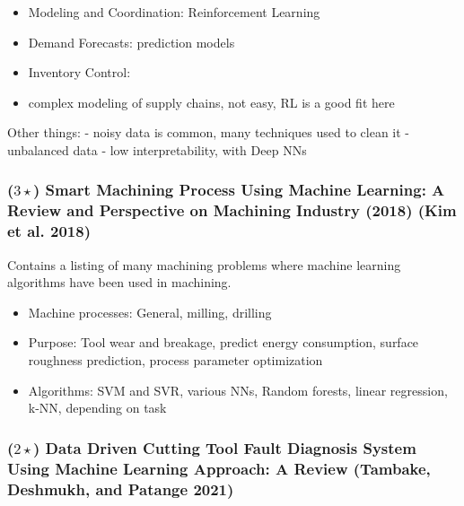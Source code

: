 \documentclass[
  letterpaper,
  DIV=11,
  numbers=noendperiod]{scrartcl}
\providecommand{\tightlist}{%
  \setlength{\itemsep}{0pt}\setlength{\parskip}{0pt}}\usepackage{longtable,booktabs,array}
\begin{document}
\begin{enumerate}
  \begin{itemize}
  \tightlist
  \item
    Modeling and Coordination: Reinforcement Learning
  \item
    Demand Forecasts: prediction models
  \item
    Inventory Control:\\
  \item
    complex modeling of supply chains, not easy, RL is a good fit here
  \end{itemize}
\end{enumerate}

Other things: - noisy data is common, many techniques used to clean it -
unbalanced data - low interpretability, with Deep NNs

\hypertarget{star-smart-machining-process-using-machine-learning-a-review-and-perspective-on-machining-industry-2018-kim2018_smartmachinereview}{%
\subsubsection{\texorpdfstring{(\(3\star\)) Smart Machining Process
Using Machine Learning: A Review and Perspective on Machining Industry
(2018) (Kim et al.
2018)}{(3\textbackslash star) Smart Machining Process Using Machine Learning: A Review and Perspective on Machining Industry (2018) (Kim et al. 2018)}}\label{star-smart-machining-process-using-machine-learning-a-review-and-perspective-on-machining-industry-2018-kim2018_smartmachinereview}}

Contains a listing of many machining problems where machine learning
algorithms have been used in machining.

\begin{itemize}
\tightlist
\item
  Machine processes: General, milling, drilling
\item
  Purpose: Tool wear and breakage, predict energy consumption, surface
  roughness prediction, process parameter optimization
\item
  Algorithms: SVM and SVR, various NNs, Random forests, linear
  regression, k-NN, depending on task
\end{itemize}

\hypertarget{star-data-driven-cutting-tool-fault-diagnosis-system-using-machine-learning-approach-a-review-tambake2021}{%
\subsubsection{\texorpdfstring{(\(2\star\)) Data Driven Cutting Tool
Fault Diagnosis System Using Machine Learning Approach: A Review
(Tambake, Deshmukh, and Patange
2021)}{(2\textbackslash star) Data Driven Cutting Tool Fault Diagnosis System Using Machine Learning Approach: A Review (Tambake, Deshmukh, and Patange 2021)}}\label{star-data-driven-cutting-tool-fault-diagnosis-system-using-machine-learning-approach-a-review-tambake2021}}
\end{document}
